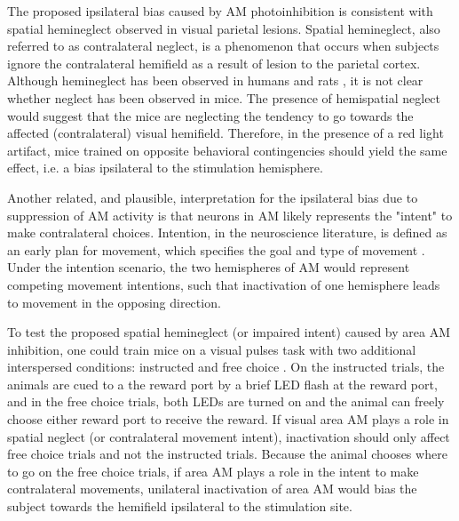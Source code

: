 The proposed ipsilateral bias caused by AM photoinhibition is consistent with spatial hemineglect observed in visual parietal lesions. Spatial hemineglect, also referred to as contralateral neglect, is a phenomenon that occurs when subjects ignore the contralateral hemifield as a result of lesion to the parietal cortex. Although hemineglect has been observed in humans \parencite{Stone1991,Kerkho2001} and rats \parencite{Crowne1986,Reep2009}, it is not clear whether neglect has been observed in mice. The presence of hemispatial neglect would suggest that the mice are neglecting the tendency to go towards the affected (contralateral) visual hemifield. Therefore, in the presence of a red light artifact, mice trained on opposite behavioral contingencies should yield the same effect, i.e. a bias ipsilateral to the stimulation hemisphere. \par 

Another related, and plausible, interpretation for the ipsilateral bias due to suppression of AM activity is that neurons in AM likely represents the "intent" to make contralateral choices. Intention, in the neuroscience literature, is defined as an early plan for movement, which specifies the goal and type of movement \parencite{Andersen2002}. Under the intention scenario, the two hemispheres of AM would represent competing movement intentions, such that inactivation of one hemisphere leads to movement in the opposing direction. 

To test the proposed spatial hemineglect (or impaired intent) caused by area AM inhibition, one could train mice on a visual pulses task with two additional interspersed conditions: instructed and free choice \parencite{Erlich2015,Katz2016}. On the instructed trials, the animals are cued to a the reward port by a brief LED flash at the reward port, and in the free choice trials, both LEDs are turned on and the animal can freely choose either reward port to receive the reward. If visual area AM plays a role in spatial neglect (or contralateral movement intent), inactivation should only affect free choice trials and not the instructed trials. Because the animal chooses where to go on the free choice trials, if area AM plays a role in the intent to make contralateral movements, unilateral inactivation of area AM would bias the subject towards the hemifield ipsilateral to the stimulation site.\par 

